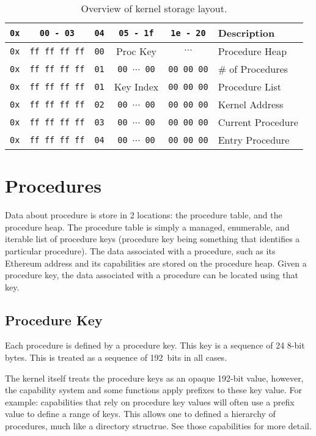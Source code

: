 \documentclass[english,a4paper]{article}
\begin{document}
\begin{table}[H]
  \caption{Overview of kernel storage layout.}
  \centering{}%
  \begin{tabularx}{\textwidth}{c | c | c | c | c | X }
    \hline
    \texttt{0x} & \texttt{00 - 03} & \texttt{04} & \texttt{05 - 1f} & \texttt{1e - 20} & Description \\
    \hline
    \hline
    \texttt{0x} & \texttt{ff ff ff ff} & \texttt{00} & Proc Key & $\cdots$ & Procedure Heap \\
    \texttt{0x} & \texttt{ff ff ff ff} & \texttt{01} & \texttt{00 $\cdots$ 00} & \texttt{00 00 00} & \# of Procedures\\
    \texttt{0x} & \texttt{ff ff ff ff} & \texttt{01} & Key Index & \texttt{00 00 00} & Procedure List \\
    \texttt{0x} & \texttt{ff ff ff ff} & \texttt{02} & \texttt{00 $\cdots$ 00} & \texttt{00 00 00} & Kernel Address \\
    \texttt{0x} & \texttt{ff ff ff ff} & \texttt{03} & \texttt{00 $\cdots$ 00} & \texttt{00 00 00} & Current Procedure \\
    \texttt{0x} & \texttt{ff ff ff ff} & \texttt{04} & \texttt{00 $\cdots$ 00} & \texttt{00 00 00} & Entry Procedure \\
    \hline
  \end{tabularx}
\end{table}

\section{Procedures}\label{procedures}
Data about procedure is store in 2 locations: the procedure table, and the
procedure heap. The procedure table is simply a managed, enumerable, and
iterable list of procedure keys (procedure key being something that identifies a
particular procedure). The data associated with a procedure, such as its
Ethereum address and its capabilities are stored on the procedure heap. Given a
procedure key, the data associated with a procedure can be located using that
key.

\subsection{Procedure Key}
Each procedure is defined by a procedure key. This key is a sequence of 24 8-bit
bytes. This is treated as a sequence of 192~bits in all cases.

The kernel itself treats the procedure keys as an opaque 192-bit value, however,
the capability system and some functions apply prefixes to these key value. For
example: capabilities that rely on procedure key values will often use a prefix
value to define a range of keys. This allows one to defined a hierarchy of
procedures, much like a directory structrue. See those capabilities for more
detail.
\end{document}
